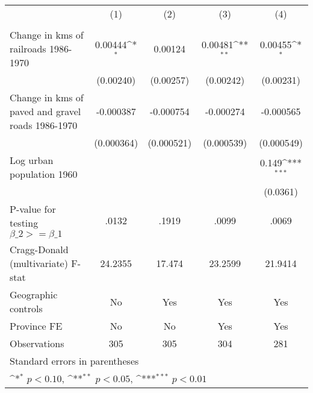 {
\def\sym#1{\ifmmode^{#1}\else\(^{#1}\)\fi}
\begin{tabular}{l*{4}{c}}
\hline\hline
                &\multicolumn{1}{c}{(1)}&\multicolumn{1}{c}{(2)}&\multicolumn{1}{c}{(3)}&\multicolumn{1}{c}{(4)}\\
                &\multicolumn{1}{c}{}&\multicolumn{1}{c}{}&\multicolumn{1}{c}{}&\multicolumn{1}{c}{}\\
\hline
Change in kms of railroads 1986-1970&  0.00444\sym{*}  &  0.00124         &  0.00481\sym{**} &  0.00455\sym{*}  \\
                &(0.00240)         &(0.00257)         &(0.00242)         &(0.00231)         \\
[1em]
Change in kms of paved and gravel roads 1986-1970&-0.000387         &-0.000754         &-0.000274         &-0.000565         \\
                &(0.000364)         &(0.000521)         &(0.000539)         &(0.000549)         \\
[1em]
Log urban population 1960&                  &                  &                  &    0.149\sym{***}\\
                &                  &                  &                  & (0.0361)         \\
\hline
P-value for testing $\beta\_{2} >= \beta\_{1}$&    .0132         &    .1919         &    .0099         &    .0069         \\
Cragg-Donald (multivariate) F-stat&  24.2355         &   17.474         &  23.2599         &  21.9414         \\
Geographic controls&       No         &      Yes         &      Yes         &      Yes         \\
Province FE     &       No         &       No         &      Yes         &      Yes         \\
Observations    &      305         &      305         &      304         &      281         \\
\hline\hline
\multicolumn{5}{l}{\footnotesize Standard errors in parentheses}\\
\multicolumn{5}{l}{\footnotesize \sym{*} \(p<0.10\), \sym{**} \(p<0.05\), \sym{***} \(p<0.01\)}\\
\end{tabular}
}
